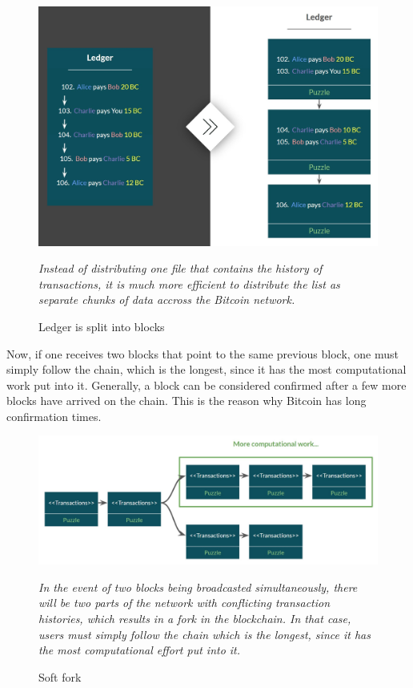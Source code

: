 \documentclass[a4paper, 12pt]{report}
\begin{document}
\begin{figure}[H]
	\includegraphics[width=\textwidth]{04_Ledger_Split}
	\caption{Ledger is split into blocks}
	\medskip
	\small \textit{Instead of distributing one file that contains the history of transactions, it is much more efficient to distribute the list as separate chunks of data accross the Bitcoin network.}
	\label{fig:04_Ledger_Split}
\end{figure}

\par Now, if one receives two blocks that point to the same previous block, one must simply follow the chain, which is the longest, since it has the most computational work put into it. Generally, a block can be considered confirmed after a few more blocks have arrived on the chain. This is the reason why Bitcoin has long confirmation times.\cite{grant}

\begin{figure}[H]
	\includegraphics[width=\textwidth]{05_Soft_Fork}
	\caption{Soft fork}
	\medskip
	\small \textit{In the event of two blocks being broadcasted simultaneously, there will be two parts of the network with conflicting transaction histories, which results in a fork in the blockchain. In that case, users must simply follow the chain which is the longest, since it has the most computational effort put into it.}
	\label{fig:05_Soft_Fork}
\end{figure}
\end{document}
